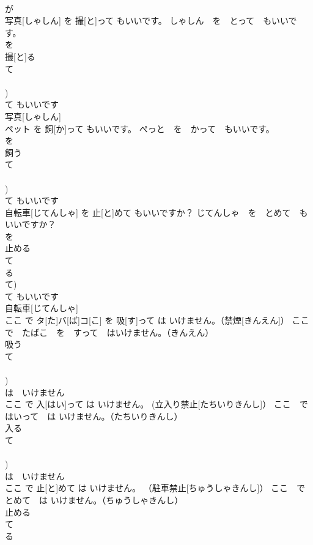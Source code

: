 \documentclass[8pt]{extreport}
\begin{document}
\begin{CJK}{UTF8}{min}
\\	が 
\\	写真[しゃしん] を 撮[と]って もいいです。	しゃしん　を　とって　もいいです。	
\\	を 
\\	撮[と]る 
\\	て 
\\	[る/つ/う] 
\\	[って])	
\\	て もいいです 
\\	写真[しゃしん] 
\\	ペット を 飼[か]って もいいです。	ぺっと　を　かって　もいいです。	
\\	を 
\\	飼う 
\\	て 
\\	[る/つ/う] 
\\	[って])	
\\	て もいいです 
\\	自転車[じてんしゃ] を 止[と]めて もいいですか？	じてんしゃ　を　とめて　もいいですか？	
\\	を 
\\	止める 
\\	て 
\\	る 
\\	て)	
\\	て もいいです 
\\	自転車[じてんしゃ] 
\\	ここ で タ[た]バ[ば]コ[こ] を 吸[す]って は いけません。（禁煙[きんえん]）	ここ　で　たばこ　を　すって　はいけません。（きんえん）	
\\	吸う 
\\	て 
\\	[る/つ/う] 
\\	[って])	
\\	は　いけません 
\\	ここ で 入[はい]って は いけません。 (立入り禁止[たちいりきんし]）	ここ　で　はいって　は いけません。（たちいりきんし）	
\\	入る 
\\	て 
\\	[る/つ/う] 
\\	[って])	
\\	は　いけません 
\\	ここ で 止[と]めて は いけません。 （駐車禁止[ちゅうしゃきんし]）	ここ　で　とめて　は いけません。（ちゅうしゃきんし）	
\\	止める 
\\	て 
\\	る 

\end{CJK}
\end{document}
